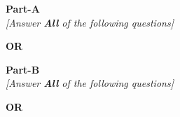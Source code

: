 \documentclass{final_exam_sust}
\begin{document}





\begin{center}
	\textbf{Part-A}\\
	\textit{[Answer \textbf{All} of the following questions]}
\end{center}


\begin{questions}
	
	\pointsdroppedatright
	\pointname{}
	\pointformat{\thepoints}



  	 

  	

  	

\begin{center}
\vspace{5mm}
\textbf{OR}
\vspace{5mm}
\end{center}	

	

\newpage

\begin{center}
	\textbf{Part-B}\\
	\textit{[Answer \textbf{All} of the following questions]}
\end{center}
  	
  	
  	


\begin{center}
\vspace{5mm}
\textbf{OR}
\vspace{5mm}
\end{center}	

	

\end{questions}
\vfill





\ifprintanswers
\else
\fi
\end{document}
